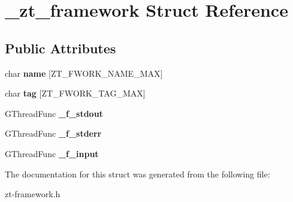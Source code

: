 \hypertarget{struct__zt__framework}{\section{\-\_\-zt\-\_\-framework Struct Reference}
\label{struct__zt__framework}
}
\subsection*{Public Attributes}
\begin{DoxyCompactItemize}
\item 
\hypertarget{struct__zt__framework_a016617abee3f2962c7ce4705b6dff4be}{char {\bfseries name} \mbox{[}Z\-T\-\_\-\-F\-W\-O\-R\-K\-\_\-\-N\-A\-M\-E\-\_\-\-M\-A\-X\mbox{]}}\label{struct__zt__framework_a016617abee3f2962c7ce4705b6dff4be}

\item 
\hypertarget{struct__zt__framework_a665b2b9fdfa0a8adb7b2f0c82a3a4e4b}{char {\bfseries tag} \mbox{[}Z\-T\-\_\-\-F\-W\-O\-R\-K\-\_\-\-T\-A\-G\-\_\-\-M\-A\-X\mbox{]}}\label{struct__zt__framework_a665b2b9fdfa0a8adb7b2f0c82a3a4e4b}

\item 
\hypertarget{struct__zt__framework_ae8ff6a5b0b139a41f05c514c09aad6b3}{G\-Thread\-Func {\bfseries \-\_\-f\-\_\-stdout}}\label{struct__zt__framework_ae8ff6a5b0b139a41f05c514c09aad6b3}

\item 
\hypertarget{struct__zt__framework_ab39e2cce2efe185fb1cf172b268d660c}{G\-Thread\-Func {\bfseries \-\_\-f\-\_\-stderr}}\label{struct__zt__framework_ab39e2cce2efe185fb1cf172b268d660c}

\item 
\hypertarget{struct__zt__framework_a8dce52b2ede3f9e4d98588eff82ad7a3}{G\-Thread\-Func {\bfseries \-\_\-f\-\_\-input}}\label{struct__zt__framework_a8dce52b2ede3f9e4d98588eff82ad7a3}

\end{DoxyCompactItemize}


The documentation for this struct was generated from the following file\-:\begin{DoxyCompactItemize}
\item 
zt-\/framework.\-h\end{DoxyCompactItemize}
